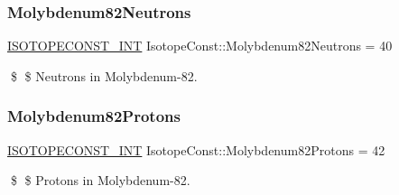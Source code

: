 \subsubsection{\texorpdfstring{Molybdenum82\+Neutrons}{Molybdenum82Neutrons}}
{\footnotesize\ttfamily \mbox{\hyperlink{group___isotope_const-_macros_ga5f18360b3e99483a35c32d789e62621c}{I\+S\+O\+T\+O\+P\+E\+C\+O\+N\+S\+T\+\_\+\+I\+NT}} Isotope\+Const\+::\+Molybdenum82\+Neutrons = 40}

\$ \$ Neutrons in Molybdenum-\/82. \mbox{\label{group___isotope_const-_molybdenum-_mo82_ga88934ad6e61d07debfab4287ae3403b1}} 
\subsubsection{\texorpdfstring{Molybdenum82\+Protons}{Molybdenum82Protons}}
{\footnotesize\ttfamily \mbox{\hyperlink{group___isotope_const-_macros_ga5f18360b3e99483a35c32d789e62621c}{I\+S\+O\+T\+O\+P\+E\+C\+O\+N\+S\+T\+\_\+\+I\+NT}} Isotope\+Const\+::\+Molybdenum82\+Protons = 42}

\$ \$ Protons in Molybdenum-\/82. 